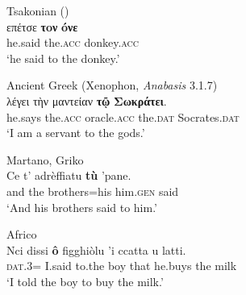 \documentclass[output=paper,modfonts,nonflat,colorlinks,citecolor=brown]{langsci/langscibook}
\begin{document}
 \newpage 
\ea\label{ex:ledgeway:10}

  \ea  Tsakonian (\citealt{ManolessouBeis2004})\\
\gll      επ\'{ε}τσε  \textbf{τoν} \textbf{óνε} \\
      he.said  the.\textsc{acc}  donkey.\textsc{acc} \\
      \glt `he said to the donkey.'
      
\ex Ancient Greek (Xenophon, \textit{Anabasis} 3.1.7)  \\
\gll  λ\'{ε}γει τὴν μαντείαν \textbf{τῷ} \textbf{Σωκράτει}.\\
      he.says  the.\textsc{acc}  oracle.\textsc{acc}  the.\textsc{dat}  Socrates.\textsc{dat}\\
      \glt `I am a servant to the gods.'

\ex Martano, Griko\\
      \gll Ce  t’  adrèffiatu  \textbf{tù} ’pane.\\
      and  the  brothers=his  him.\textsc{gen}  said\\
      \glt `And his brothers said to him.'

\ex Africo\\
      \gll Nci  dissi  \textbf{ô} figghiòlu  ’i  ccatta  u  latti.\\
      \textsc{dat}.3=  I.said  to.the  boy  that  he.buys  the  milk\\
      \glt `I told the boy to buy the milk.'
      \z
      \z
\end{document}
